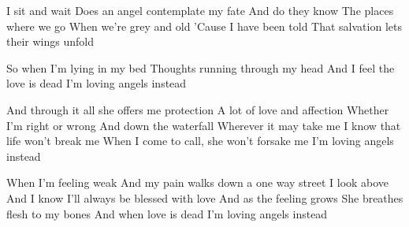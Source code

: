\begin{verse*}
I sit and wait
Does an angel contemplate my fate
And do they know
The places where we go
When we're grey and old
'Cause I have been told
That salvation lets their wings unfold
\end{verse*}

\begin{verse*}
So when I'm lying in my bed
Thoughts running through my head
And I feel the love is dead
I'm loving angels instead
\end{verse*}

\begin{chorus}
And through it all she offers me protection
A lot of love and affection
Whether I'm right or wrong
And down the waterfall
Wherever it may take me
I know that life won't break me
When I come to call, she won't forsake me
I'm loving angels instead
\end{chorus}

\begin{verse*}
When I'm feeling weak
And my pain walks down a one way street
I look above
And I know I'll always be blessed with love
And as the feeling grows
She breathes flesh to my bones
And when love is dead
I'm loving angels instead
\end{verse*}

\thechorus[2]
